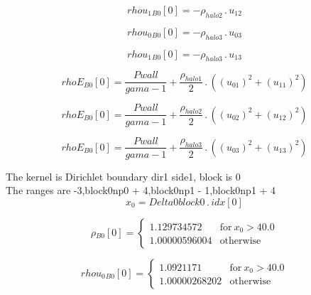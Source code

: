 \documentclass{article}
\begin{document}
\begin{dmath}{rhou_{1}{_{B0}}}[{0}] = - \rho_{halo 2} \,.\, u_{12}\end{dmath}

\begin{dmath}{rhou_{0}{_{B0}}}[{0}] = - \rho_{halo 3} \,.\, u_{03}\end{dmath}

\begin{dmath}{rhou_{1}{_{B0}}}[{0}] = - \rho_{halo 3} \,.\, u_{13}\end{dmath}

\begin{dmath}{rhoE{_{B0}}}[{0}] = \frac{Pwall}{gama - 1} + \frac{\rho_{halo 1}}{2} \,.\, \left(\left(u_{01} \right)^{2} + \left(u_{11} \right)^{2}\right)\end{dmath}

\begin{dmath}{rhoE{_{B0}}}[{0}] = \frac{Pwall}{gama - 1} + \frac{\rho_{halo 2}}{2} \,.\, \left(\left(u_{02} \right)^{2} + \left(u_{12} \right)^{2}\right)\end{dmath}

\begin{dmath}{rhoE{_{B0}}}[{0}] = \frac{Pwall}{gama - 1} + \frac{\rho_{halo 3}}{2} \,.\, \left(\left(u_{03} \right)^{2} + \left(u_{13} \right)^{2}\right)\end{dmath}

\noindent The kernel is Dirichlet boundary dir1 side1, block is 0\\\noindent The ranges are -3,block0np0 + 4,block0np1 - 1,block0np1 + 4\\\begin{dmath}x_{0} = Delta0block0 \,.\, {idx}[{0}]\end{dmath}

\begin{dmath}{\rho{_{B0}}}[{0}] = \begin{cases} 1.129734572 & \text{for}\: x_{0} > 40.0 \\1.00000596004 & \text{otherwise} \end{cases}\end{dmath}

\begin{dmath}{rhou_{0}{_{B0}}}[{0}] = \begin{cases} 1.0921171 & \text{for}\: x_{0} > 40.0 \\1.00000268202 & \text{otherwise} \end{cases}\end{dmath}
\end{document}
